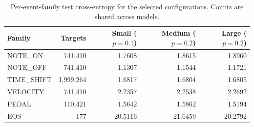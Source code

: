 \begin{table}[H]
\centering
\caption{Per-event-family test cross-entropy for the selected configurations. Counts are shared across models.}
\label{tab:eventdiagnostics}
\begin{tabular}{lrrrr}
\toprule Family & Targets & Small ($p=0.1$) & Medium ($p=0.2$) & Large ($p=0.2$)\\\midrule
NOTE\_ON & 741,410 & 1.7608 & 1.8615 & 1.8960\\
NOTE\_OFF & 741,410 & 1.1307 & 1.1544 & 1.1721\\
TIME\_SHIFT & 1,999,264 & 1.6817 & 1.6804 & 1.6805\\
VELOCITY & 741,410 & 2.2357 & 2.2538 & 2.2692\\
PEDAL & 110,421 & 1.5642 & 1.5862 & 1.5194\\
EOS & 177 & 20.5116 & 21.6459 & 20.2792\\
\bottomrule
\end{tabular}
\end{table}
